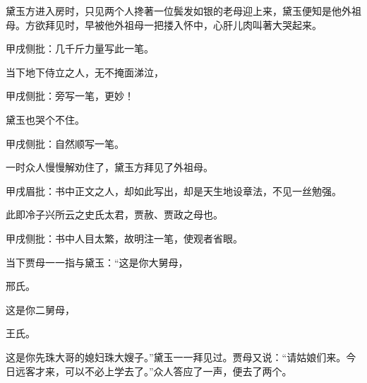 \begin{parag}
    黛玉方进入房时，只见两个人搀著一位鬓发如银的老母迎上来，黛玉便知是他外祖母。方欲拜见时，早被他外祖母一把搂入怀中，心肝儿肉叫著大哭起来。\begin{note}甲戌侧批：几千斤力量写此一笔。\end{note}当下地下侍立之人，无不掩面涕泣，\begin{note}甲戌侧批：旁写一笔，更妙！\end{note}黛玉也哭个不住。\begin{note}甲戌侧批：自然顺写一笔。\end{note}一时众人慢慢解劝住了，黛玉方拜见了外祖母。\begin{note}甲戌眉批：书中正文之人，却如此写出，却是天生地设章法，不见一丝勉强。\end{note}此即冷子兴所云之史氏太君，贾赦、贾政之母也。\begin{note}甲戌侧批：书中人目太繁，故明注一笔，使观者省眼。\end{note}当下贾母一一指与黛玉：“这是你大舅母，\begin{note}邢氏。\end{note}这是你二舅母，\begin{note}王氏。\end{note}这是你先珠大哥的媳妇珠大嫂子。”黛玉一一拜见过。贾母又说：“请姑娘们来。今日远客才来，可以不必上学去了。”众人答应了一声，便去了两个。
\end{parag}


